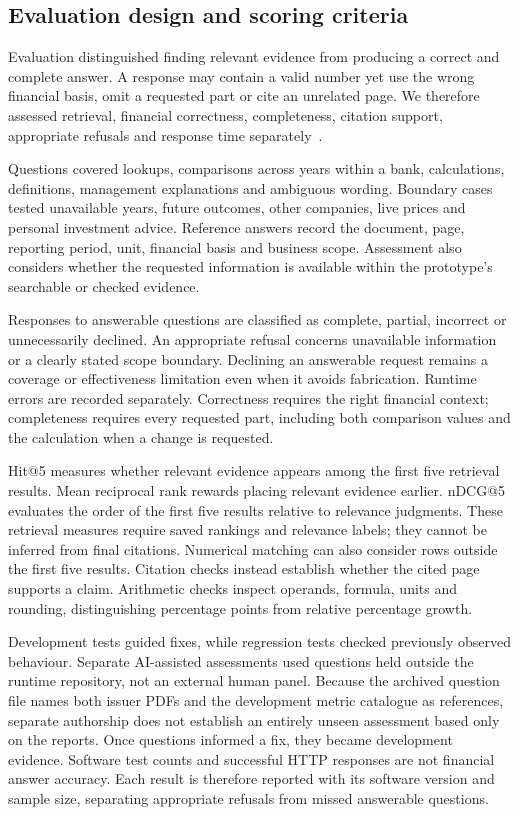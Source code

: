 \subsection{Evaluation design and scoring criteria}
\label{subsec:evaluation_design}

Evaluation distinguished finding relevant evidence from producing a correct and complete answer. A response may contain a valid number yet use the wrong financial basis, omit a requested part or cite an unrelated page. We therefore assessed retrieval, financial correctness, completeness, citation support, appropriate refusals and response time separately~\cite{fintraceEval2026}.

Questions covered lookups, comparisons across years within a bank, calculations, definitions, management explanations and ambiguous wording. Boundary cases tested unavailable years, future outcomes, other companies, live prices and personal investment advice. Reference answers record the document, page, reporting period, unit, financial basis and business scope. Assessment also considers whether the requested information is available within the prototype's searchable or checked evidence.

Responses to answerable questions are classified as complete, partial, incorrect or unnecessarily declined. An appropriate refusal concerns unavailable information or a clearly stated scope boundary. Declining an answerable request remains a coverage or effectiveness limitation even when it avoids fabrication. Runtime errors are recorded separately. Correctness requires the right financial context; completeness requires every requested part, including both comparison values and the calculation when a change is requested.

Hit@5 measures whether relevant evidence appears among the first five retrieval results. Mean reciprocal rank rewards placing relevant evidence earlier. nDCG@5 evaluates the order of the first five results relative to relevance judgments. These retrieval measures require saved rankings and relevance labels; they cannot be inferred from final citations. Numerical matching can also consider rows outside the first five results. Citation checks instead establish whether the cited page supports a claim. Arithmetic checks inspect operands, formula, units and rounding, distinguishing percentage points from relative percentage growth.

Development tests guided fixes, while regression tests checked previously observed behaviour. Separate AI-assisted assessments used questions held outside the runtime repository, not an external human panel. Because the archived question file names both issuer PDFs and the development metric catalogue as references, separate authorship does not establish an entirely unseen assessment based only on the reports. Once questions informed a fix, they became development evidence. Software test counts and successful HTTP responses are not financial answer accuracy. Each result is therefore reported with its software version and sample size, separating appropriate refusals from missed answerable questions.
